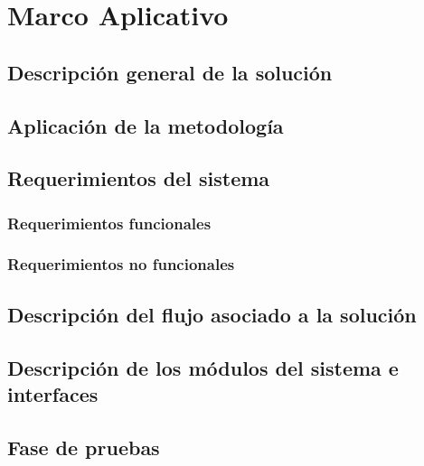 \chapter{Marco Aplicativo}

\section{Descripción general de la solución}

\section{Aplicación de la metodología}

\section{Requerimientos del sistema}

\subsection{Requerimientos funcionales}

\subsection{Requerimientos no funcionales}

\section{Descripción del flujo asociado a la solución}


\section{Descripción de los módulos del sistema e interfaces}

\section{Fase de pruebas}